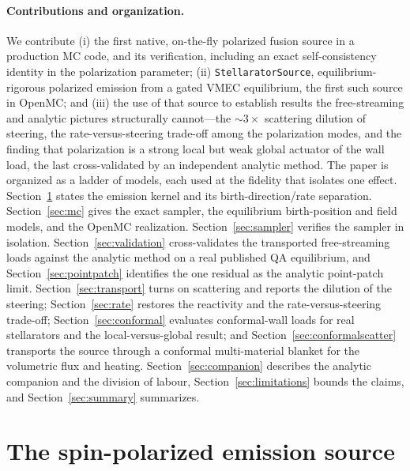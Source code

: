 \documentclass[11pt]{article}
\begin{document}
\paragraph{Contributions and organization.}
We contribute (i) the first native, on-the-fly polarized fusion source in a production MC
code, and its verification, including an exact self-consistency identity in the
polarization parameter; (ii) \texttt{StellaratorSource}, equilibrium-rigorous polarized
emission from a gated VMEC equilibrium, the first such source in OpenMC; and (iii) the use
of that source to establish results the free-streaming and analytic pictures structurally
cannot---the $\sim\!3\times$ scattering dilution of steering, the rate-versus-steering
trade-off among the polarization modes, and the finding that polarization is a strong local
but weak global actuator of the wall load, the last cross-validated by an independent
analytic method. The paper is organized as a ladder of models, each used at the fidelity
that isolates one effect. Section~\ref{sec:source} states the emission kernel and its
birth-direction/rate separation. Section~\ref{sec:mc} gives the exact sampler, the
equilibrium birth-position and field models, and the OpenMC realization.
Section~\ref{sec:sampler} verifies the sampler in isolation. Section~\ref{sec:validation}
cross-validates the transported free-streaming loads against the analytic method on a real
published QA equilibrium, and Section~\ref{sec:pointpatch} identifies the one residual as
the analytic point-patch limit. Section~\ref{sec:transport} turns on scattering and reports
the dilution of the steering; Section~\ref{sec:rate} restores the reactivity and the
rate-versus-steering trade-off; Section~\ref{sec:conformal} evaluates conformal-wall loads
for real stellarators and the local-versus-global result; and
Section~\ref{sec:conformalscatter} transports the source through a conformal multi-material
blanket for the volumetric flux and heating. Section~\ref{sec:companion}
describes the analytic companion and the division of labour, Section~\ref{sec:limitations}
bounds the claims, and Section~\ref{sec:summary} summarizes.

\section{The spin-polarized emission source}
\label{sec:source}
\end{document}
